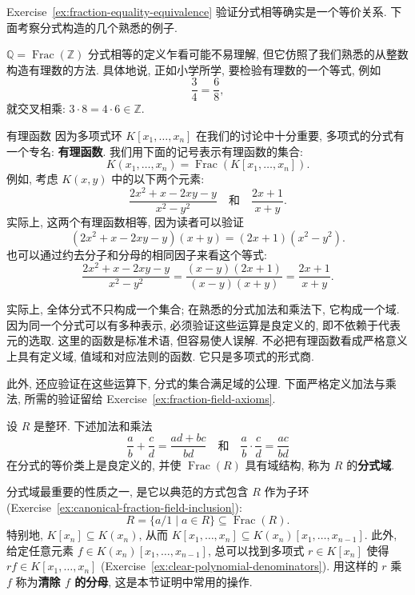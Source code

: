 Exercise~\ref{ex:fraction-equality-equivalence} 验证分式相等确实是一个等价关系. 下面考察分式构造的几个熟悉的例子.

\begin{Example}{{\textmd{$\mathbb{Q}=\operatorname{Frac}(\mathbb{Z})$}}}\label{ex:rationals-as-fraction-field}
  分式相等的定义乍看可能不易理解, 但它仿照了我们熟悉的从整数构造有理数的方法. 具体地说, 正如小学所学, 要检验有理数的一个等式, 例如
  \[
    \frac{3}{4}=\frac{6}{8},
  \]
  就交叉相乘: $3\cdot8=4\cdot6\in\mathbb{Z}$.
\end{Example}

\begin{Example}{有理函数}\label{ex:rational-functions}
  因为多项式环 $K[x_{1},\ldots,x_{n}]$ 在我们的讨论中十分重要, 多项式的分式有一个专名: \textbf{有理函数}. 我们用下面的记号表示有理函数的集合:
  \[
    K(x_{1},\ldots,x_{n})=\operatorname{Frac}(K[x_{1},\ldots,x_{n}]).
  \]
  例如, 考虑 $K(x,y)$ 中的以下两个元素:
  \[
    \frac{2x^{2}+x-2xy-y}{x^{2}-y^{2}}
    \quad\text{和}\quad\frac{2x+1}{x+y}.
  \]
  实际上, 这两个有理函数相等, 因为读者可以验证
  \[
    (2x^{2}+x-2xy-y)(x+y)=(2x+1)(x^{2}-y^{2}).
  \]
  也可以通过约去分子和分母的相同因子来看这个等式:
  \[
    \frac{2x^{2}+x-2xy-y}{x^{2}-y^{2}}
    =\frac{(x-y)(2x+1)}{(x-y)(x+y)}
    =\frac{2x+1}{x+y}.
  \]
\end{Example}

\begin{BookFlowNote}[l]{%
实际上, 全体分式不只构成一个集合; 在熟悉的分式加法和乘法下, 它构成一个域. 因为同一个分式可以有多种表示, 必须验证这些运算是良定义的, 即不依赖于代表元的选取.
}
\noindent 这里的\textquotedbl{}函数\textquotedbl{}是标准术语, 但容易使人误解. 不必把有理函数看成严格意义上具有定义域, 值域和对应法则的函数. 它只是多项式的形式商.

\noindent 此外, 还应验证在这些运算下, 分式的集合满足域的公理. 下面严格定义加法与乘法, 所需的验证留给 Exercise~\ref{ex:fraction-field-axioms}.
\end{BookFlowNote}

\begin{BookPropositionDefinition}[分式域]\leavevmode\label{def:fraction-field}
  设 $R$ 是整环. 下述加法和乘法
  \[
    \frac{a}{b}+\frac{c}{d}=\frac{ad+bc}{bd}
    \quad\text{和}\quad
    \frac{a}{b}\cdot\frac{c}{d}=\frac{ac}{bd}
  \]
  在分式的等价类上是良定义的, 并使 $\operatorname{Frac}(R)$ 具有域结构, 称为 $R$ 的\textbf{分式域}.
\end{BookPropositionDefinition}

分式域最重要的性质之一, 是它以典范的方式包含 $R$ 作为子环 (Exercise~\ref{ex:canonical-fraction-field-inclusion}):
\[
  R=\{a/1\mid a\in R\}\subseteq\operatorname{Frac}(R).
\]
特别地, $K[x_{n}]\subseteq K(x_{n})$, 从而 $K[x_{1},\ldots,x_{n}]\subseteq K(x_{n})[x_{1},\ldots,x_{n-1}]$. 此外, 给定任意元素 $f\in K(x_{n})[x_{1},\ldots,x_{n-1}]$, 总可以找到多项式 $r\in K[x_{n}]$ 使得 $rf\in K[x_{1},\ldots,x_{n}]$ (Exercise~\ref{ex:clear-polynomial-denominators}). 用这样的 $r$ 乘 $f$ 称为\textbf{清除 $f$ 的分母}, 这是本节证明中常用的操作.

